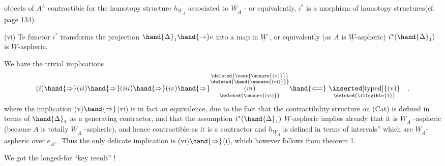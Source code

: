 objects of $A^{\wedge}$ contractible for the homotopy structure $h_{\underline{W}_A}$ associated to
$\underline{W}_A$ - or equivalently, $i^{*}$ is a morphism of homotopy structures(cf. %
 page 134).

(vi) Te functor $i^{*}$ transforms the projection $\hand{\Delta}_1 \hand{\to} e$ into a
 map in $\underline{W}$ , or equivalently (as $A$ is $\underline{W}$-aspheric) $i^{*}(\hand{\Delta}_1)$
is $\underline{W}$-aspheric.

We have the trivial implications
\[ (i)\hand{\Rightarrow}(ii)\hand{\Rightarrow}(iii)\hand{\Rightarrow}(iv)\hand{\Rightarrow}
\underset{\text{\deleted{\unsure{(vi)}}}}{\overset{\substack{\text{\deleted{\xout{\unsure{(v)}}}}\\\text{\deleted{\hand{\unsure{(vi)}}}}}}{(vi)}}
\hand{\Longleftarrow}\ \underset{\text{\deleted{\illegible{1}}}}{\text{\inserted[typed]{(v)}}}\quad , \]
where the implication (v)$\hand{\Rightarrow}$(vi) is in fact an equivalence, due to the
fact that the contractibility structure on (Cat) is defined in terms of
$\hand{\Delta}_1$ as a generating  contractor, and that the assumption $i^{*}(\hand{\Delta}_1)$
$\underline{W}$-aspheric implies already that it is $\underline{W}_A$ -aspheric  (because $A$ is totally
$\underline{W}_A$ -aspheric), and hence contractible as it is a contractor and $h_{\underline{W}_A}$ is
defined in terms of   intervals'' which are $\underline{W}_A$-aspheric over $e_{A^{\wedge}}$. Thus
the only delicate implication is (vi)$\hand{\Rightarrow}$(i), which however follows from
\hand{(}theorem 1.

We got the longed-for ``key result''   !


